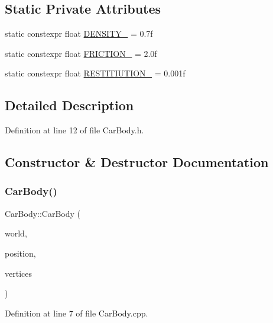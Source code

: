 \subsection*{Static Private Attributes}
\begin{DoxyCompactItemize}
\item 
static constexpr float \hyperlink{classCarBody_a451074380bc9169117e9beb8303840fe}{D\+E\+N\+S\+I\+T\+Y\+\_\+} = 0.\+7f
\item 
static constexpr float \hyperlink{classCarBody_af87fcb5e61d186798ee126508eaf5f3f}{F\+R\+I\+C\+T\+I\+O\+N\+\_\+} = 2.\+0f
\item 
static constexpr float \hyperlink{classCarBody_a726ff99793ed9dfc0f96e3690c3035f8}{R\+E\+S\+T\+I\+T\+I\+U\+T\+I\+O\+N\+\_\+} = 0.\+001f
\end{DoxyCompactItemize}


\subsection{Detailed Description}


Definition at line 12 of file Car\+Body.\+h.



\subsection{Constructor \& Destructor Documentation}
\mbox{\label{classCarBody_a060cf8a8c5d2313c331de3dbe8ea93e9}} 
\subsubsection{\texorpdfstring{Car\+Body()}{CarBody()}}
{\footnotesize\ttfamily Car\+Body\+::\+Car\+Body (\begin{DoxyParamCaption}\item[{b2\+World \&}]{world,  }\item[{const b2\+Vec2 \&}]{position,  }\item[{const std\+::vector$<$ b2\+Vec2 $>$ \&}]{vertices }\end{DoxyParamCaption})}



Definition at line 7 of file Car\+Body.\+cpp.


